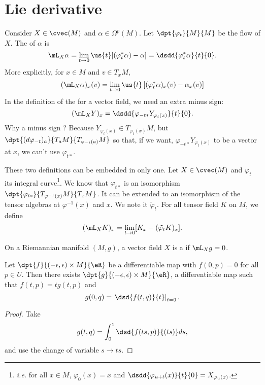 \section{Lie derivative}

Consider $X\in\cvec(M)$ and $\alpha\in\Omega^p(M)$. Let $\dpt{\varphi_t}{M}{M}$ be the flow of $X$. The  of $\alpha$ is
\begin{equation}\label{liesurforme}
         \mL_X\alpha=\lim_{t\to 0}\us{t}[(\varphi^*_t\alpha)-\alpha]=\dsdd{\varphi^*_t\alpha}{t}{0}.
\end{equation}
More explicitly, for $x\in M$ and $v\in T_xM$,
\[
             (\mL_X\alpha)_x(v)=\lim_{t\to 0}\us{t}\left[(\varphi_t^*\alpha)_x(v)-\alpha_x(v)\right]
\]
In the definition of the  for a vector field, we need an extra minus sign:
\begin{equation}		\label{EqDefLieDerivativeVect}
            (\mL_XY)_x=\dsdd{\varphi_{-t*}Y_{\varphi_t(x)}}{t}{0}.
\end{equation}
Why a minus sign ? Because $Y_{\varphi_t(x)}\in T_{\varphi_t(x)}M$, but $\dpt{(d\varphi_{-t})_a}{T_aM}{T_{\varphi_{-t}(a)}M}$ so that, if we want, $\varphi_{-t*}Y_{\varphi_t(x)}$ to be a vector at $x$, we can't use $\varphi_{t*}$.

These two definitions can be embedded in only one. Let $X\in\cvec(M)$ and $\varphi_t$ its integral curve\footnote{\textit{i.e.} for all $x\in M$, $\varphi_0(x)=x$ and $\dsdd{\varphi_{u+t}(x)}{t}{0}=X_{\varphi_u(x)}$.}. We know that $\varphi_{t*}$ is an isomorphism $\dpt{\varphi_{t*}}{T_{\varphi^{-1}(x)}M}{T_xM}$. It can be extended to an isomorphism of the tensor algebras at $\varphi^{-1}(x)$ and $x$. We note it $\tilde{\varphi}_t$. For all tensor field $K$ on $M$, we define
\[
            (\mL_XK)_x=\lim_{t\to 0}[K_x-(\tilde{\varphi_t}K)_x].
\]

On a Riemannian manifold $(M,g)$, a vector field $X$ is a  if $\mL_Xg=0$.



\begin{lemma}
Let $\dpt{f}{(-\epsilon,\epsilon)\times M}{\eR}$ be a differentiable map with $f(0,p)=0$ for all $p\in U$. Then there exists $\dpt{g}{(-\epsilon,\epsilon)\times M}{\eR}$, a differentiable map such that $f(t,p)=tg(t,p)$ and
\[
                g(0,q)=\left.\dsd{f(t,q)}{t}\right|_{t=0}.
\]
\end{lemma}
\begin{proof}
Take
\[
                g(t,q)=\int_0^1\dsd{f(ts,p)}{(ts)}ds,
\]
and use the change of variable $s\to ts$.
\end{proof}

